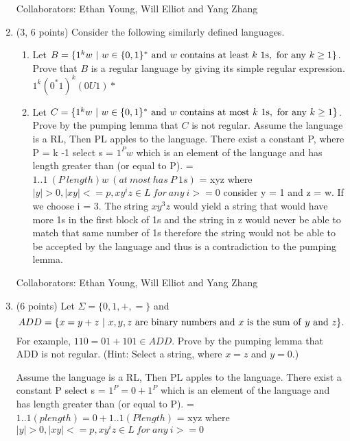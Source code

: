 \documentclass[11pt]{article}
\begin{document}
\begin{enumerate}
Collaborators: Ethan Young, Will Elliot and Yang Zhang

\item (3, 6 points) Consider the following similarly defined languages.

\begin{enumerate}
\item Let $B=\{1^kw\ |\ w\in\{0,1\}^*{\rm\ and\ }w{\rm\ contains\ at\ least\ }k{\rm\ 1s,\ for\ any\ }k\ge1\}$. Prove that $B$ is a regular language by giving its simple regular expression.
\newline $1^{k} (0^* 1)^k (0U1)*$

\item Let $C=\{1^kw\ |\ w\in\{0,1\}^*{\rm\ and\ }w{\rm\ contains\ at\ most\ }k{\rm\ 1s,\ for\ any\ }k\ge1\}$. Prove by the pumping lemma that $C$ is not regular.
\newline 
Assume the language is a RL, Then PL apples to the language. \newline 
There exist a constant P, where P = k -1\newline 
select s = $1^{P}w$ which is an element of the language and has length greater than (or equal to P). \newline 
= $1..1 \ (P \ length) w \ (at \ most\  has\   P\  1s)$ = xyz \newline where $|y| > 0, |xy| <= p, xy^{i}z \in L \ for \  any \ i >=0$\newline 
consider y = 1 and z = w. If we choose i = 3. The string $xy^3z$ would yield a string that would have more 1s in the first block of 1s and the string in z would never be able to match that same number of 1s therefore the string would not be able to be accepted by the language and thus is a contradiction to the pumping lemma. 
\end{enumerate}

Collaborators: Ethan Young, Will Elliot and Yang Zhang

\item (6 points) Let $\Sigma=\{0, 1, +, =\}$ and $$ADD=\{x=y+z\ |\ x, y, z {\rm\ are\ binary\ numbers\ and\ }x{\rm\ is\ the\ sum\ of\ }y{\rm\ and\ }z\}.$$
For example, $110=01+101\in ADD$. Prove by the pumping lemma that ADD is not regular. (Hint: Select a string, where $x=z$ and $y=0$.)

Assume the language is a RL, Then PL apples to the language. \newline 
There exist a constant P \newline 
select s = $1^P = 0 + 1^P$ which is an element of the language and has length greater than (or equal to P). \newline 
= $1..1(p length) = 0 + 1..1(P length)$ = xyz \newline where $|y| > 0, |xy| <= p, xy^{i}z \in L \ for \  any \ i >=0$\newline 


\end{enumerate}
\end{document}

